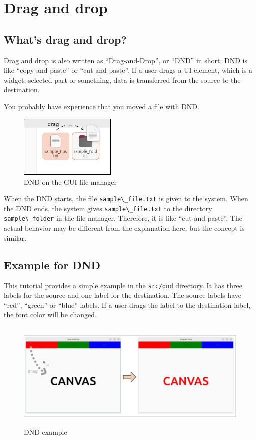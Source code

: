 \section{Drag and drop}\label{drag-and-drop}

\subsection{What's drag and drop?}\label{whats-drag-and-drop}

Drag and drop is also written as ``Drag-and-Drop'', or ``DND'' in short.
DND is like ``copy and paste'' or ``cut and paste''. If a user drags a
UI element, which is a widget, selected part or something, data is
transferred from the source to the destination.

You probably have experience that you moved a file with DND.

\begin{figure}
\centering
\includegraphics[width=4.6cm,height=3cm]{../image/dnd.png}
\caption{DND on the GUI file manager}
\end{figure}

When the DND starts, the file \passthrough{\lstinline!sample\_file.txt!}
is given to the system. When the DND ends, the system gives
\passthrough{\lstinline!sample\_file.txt!} to the directory
\passthrough{\lstinline!sample\_folder!} in the file manager. Therefore,
it is like ``cut and paste''. The actual behavior may be different from
the explanation here, but the concept is similar.

\subsection{Example for DND}\label{example-for-dnd}

This tutorial provides a simple example in the
\passthrough{\lstinline!src/dnd!} directory. It has three labels for the
source and one label for the destination. The source labels have
``red'', ``green'' or ``blue'' labels. If a user drags the label to the
destination label, the font color will be changed.

\begin{figure}
\centering
\includegraphics[width=13.5cm,height=5.2cm]{../image/dnd_canvas.png}
\caption{DND example}
\end{figure}

